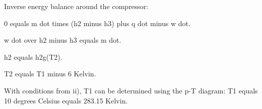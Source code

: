 Inverse energy balance around the compressor:

0 equals m dot times (h2 minus h3) plus q dot minus w dot.

w dot over h2 minus h3 equals m dot.

h2 equals h2g(T2).

T2 equals T1 minus 6 Kelvin.

With conditions from ii), T1 can be determined using the p-T diagram: T1 equals 10 degrees Celsius equals 283.15 Kelvin.
